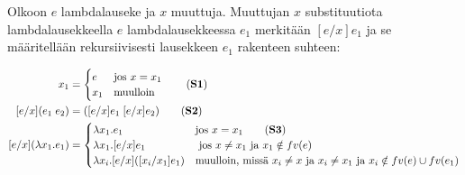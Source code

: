 \begin{maar}[substituutiosäännöt]
Olkoon $e$ lambdalauseke ja $x$ muuttuja. Muuttujan $x$ substituutiota lambdalausekkeella $e$ lambdalausekkeessa $e_{1}$ merkitään $[e/x] e_{1}$ ja se määritellään rekursiivisesti lausekkeen $e_{1}$ rakenteen suhteen:  


\begin{align*}
[e/x]x_{1} &= 
        \begin{cases}
                e & \text{jos } x = x_{1} \\
                x_{1} & \text{muulloin}
        \end{cases}
        \label{eq:S1} \tag{\textbf{S1}} \\
[e/x](e_{1} \; e_{2}) &= ([e/x]e_{1} \; [e/x]e_{2}) \label{eq:S2} \tag{\textbf{S2}} \\
[e/x](\lambda x_{1}.e_{1}) &= 
        \begin{cases}
                \lambda x_{1}.e_{1} & \text{jos } x = x_{1} \label{eq:S3} \tag{\textbf{S3}} \\
                \lambda x_{1}.[e/x]e_{1} & \text{ jos } x \neq x_{1} \text{ ja } x_{1} \notin fv(e) \\
                \lambda x_{i}.[e/x]([x_{i}/x_{1}]e_{1}) & \text{muulloin, missä } x_{i} \neq x \text { ja } x_{i} \neq x_{1} \text{ ja } x_{i} \notin fv(e) \cup fv(e_{1})
        \end{cases}       
\end{align*}

\end{maar} 

